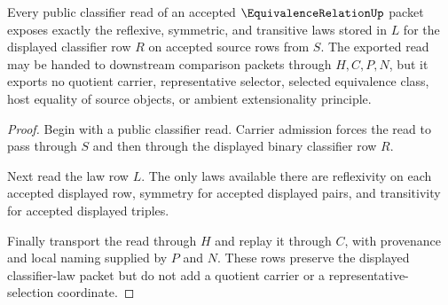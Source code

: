\begin{theorem}
\label{thm:equivalence-relation-classifier-laws}
Every public classifier read of an accepted $\EquivalenceRelationUp$ packet exposes exactly the reflexive, symmetric, and transitive laws stored in $L$ for the displayed classifier row $R$ on accepted source rows from $S$. The exported read may be handed to downstream comparison packets through $H,C,P,N$, but it exports no quotient carrier, representative selector, selected equivalence class, host equality of source objects, or ambient extensionality principle.
\end{theorem}
\begin{proof}
Begin with a public classifier read. Carrier admission forces the read to pass through $S$ and then through the displayed binary classifier row $R$.

Next read the law row $L$. The only laws available there are reflexivity on each accepted displayed row, symmetry for accepted displayed pairs, and transitivity for accepted displayed triples.

Finally transport the read through $H$ and replay it through $C$, with provenance and local naming supplied by $P$ and $N$. These rows preserve the displayed classifier-law packet but do not add a quotient carrier or a representative-selection coordinate.
\end{proof}


\begin{closurestatus}{\EquivalenceRelationUp}
  \theoryclosure{\seedClosure}
  \formalstatus{\unformalizedV}
\end{closurestatus}

